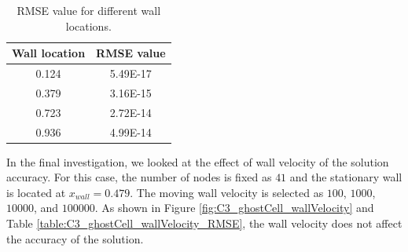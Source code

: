\begin{table}[H]
\centering
\begin{tabular}{c | c}
     Wall location & RMSE value \\ \hline \hline
     0.124 & 5.49E-17 \\ \hline
     0.379 & 3.16E-15 \\ \hline
     0.723 & 2.72E-14 \\ \hline
     0.936 & 4.99E-14
\end{tabular}
\caption{RMSE value for different wall locations.}
\label{table:C3_ghostCell_wallLocation_RMSE}
\end{table}

In the final investigation, we looked at the effect of wall velocity of the solution accuracy. For this case, the number of nodes is fixed as $41$ and the stationary wall is located at $x_{wall} = 0.479$. The moving wall velocity is selected as $100$, $1000$, $10000$, and $100000$. As shown in Figure \ref{fig:C3_ghostCell_wallVelocity} and Table \ref{table:C3_ghostCell_wallVelocity_RMSE}, the wall velocity does not affect the accuracy of the solution.


